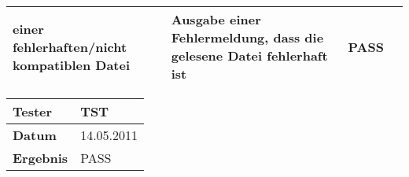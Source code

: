 \begin{table}[h]
\begin{center}
\begin{tabular}{|p{2cm}|p{3.9cm}|p{3.9cm}|p{3.8cm}|}
                einer fehlerhaften/nicht kompatiblen Datei & Ausgabe einer
                Fehlermeldung, dass die gelesene Datei fehlerhaft ist &
                PASS \\
            \hline
        \end{tabular}
        \begin{tabular}{|p{3.5cm}|p{11cm}|}
                \textbf{Tester} & TST\\
            \hline
                \textbf{Datum} & 14.05.2011\\
            \hline
                \textbf{Ergebnis} & PASS\\
            \hline
        \end{tabular}
    \end{center}
\end{table}

